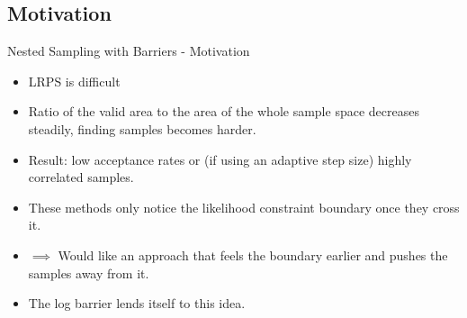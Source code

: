 \documentclass[]{beamer}
\begin{document}
  \subsection{Motivation}
  \begin{frame}{Nested Sampling with Barriers - Motivation}
    \begin{itemize}
      \item LRPS is difficult \pause
      \item Ratio of the valid area to the area of the whole sample space decreases steadily, finding samples becomes harder. \pause
      \item Result: low acceptance rates or (if using an adaptive step size) highly correlated samples. \pause
      \item These methods only notice the likelihood constraint boundary once they cross it. \pause
      \item $\implies$ Would like an approach that feels the boundary earlier and pushes the samples away from it. \pause
      \item The log barrier lends itself to this idea.
    \end{itemize}
  \end{frame}
\end{document}
